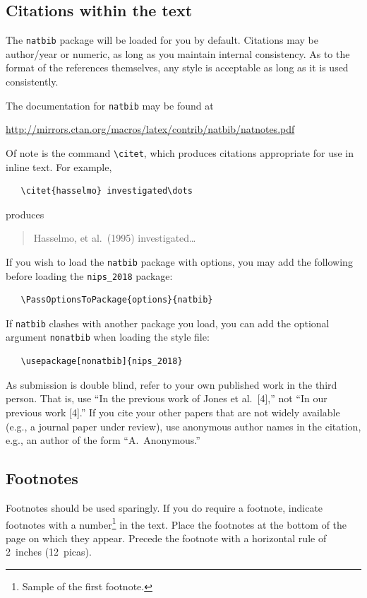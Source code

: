 \documentclass{article}
\begin{document}
\subsection{Citations within the text}

The \verb+natbib+ package will be loaded for you by default.
Citations may be author/year or numeric, as long as you maintain
internal consistency.  As to the format of the references themselves,
any style is acceptable as long as it is used consistently.

The documentation for \verb+natbib+ may be found at
\begin{center}
  \url{http://mirrors.ctan.org/macros/latex/contrib/natbib/natnotes.pdf}
\end{center}
Of note is the command \verb+\citet+, which produces citations
appropriate for use in inline text.  For example,
\begin{verbatim}
   \citet{hasselmo} investigated\dots
\end{verbatim}
produces
\begin{quote}
  Hasselmo, et al.\ (1995) investigated\dots
\end{quote}

If you wish to load the \verb+natbib+ package with options, you may
add the following before loading the \verb+nips_2018+ package:
\begin{verbatim}
   \PassOptionsToPackage{options}{natbib}
\end{verbatim}

If \verb+natbib+ clashes with another package you load, you can add
the optional argument \verb+nonatbib+ when loading the style file:
\begin{verbatim}
   \usepackage[nonatbib]{nips_2018}
\end{verbatim}

As submission is double blind, refer to your own published work in the
third person. That is, use ``In the previous work of Jones et
al.\ [4],'' not ``In our previous work [4].'' If you cite your other
papers that are not widely available (e.g., a journal paper under
review), use anonymous author names in the citation, e.g., an author
of the form ``A.\ Anonymous.''

\subsection{Footnotes}

Footnotes should be used sparingly.  If you do require a footnote,
indicate footnotes with a number\footnote{Sample of the first
  footnote.} in the text. Place the footnotes at the bottom of the
page on which they appear.  Precede the footnote with a horizontal
rule of 2~inches (12~picas).
\end{document}
